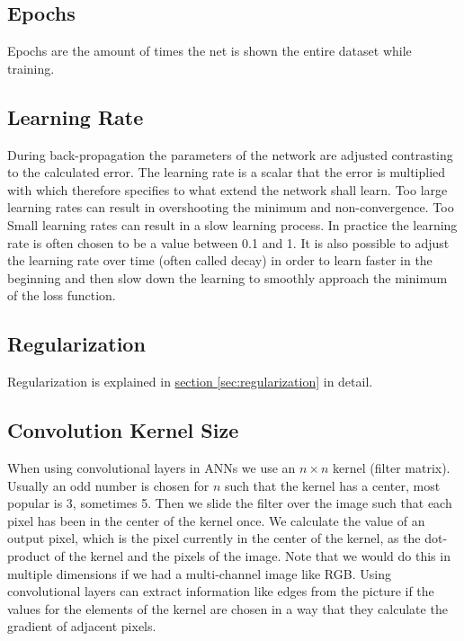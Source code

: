 \subsection{Epochs}

Epochs are the amount of times the net is shown the entire dataset while training.

\subsection{Learning Rate}
\label{sec:learning_rate}

During back-propagation the parameters of the network are adjusted contrasting to the calculated error. The learning rate is a scalar that the error is multiplied with which therefore specifies to what extend the network shall learn. Too large learning rates can result in overshooting the minimum and non-convergence. Too Small learning rates can result in a slow learning process. In practice the learning rate is often chosen to be a value between 0.1 and 1. It is also possible to adjust the learning rate over time (often called decay) in order to learn faster in the beginning and then slow down the learning to smoothly approach the minimum of the loss function.

\subsection{Regularization}

Regularization is explained in \hyperref[sec:regularization]{section \ref*{sec:regularization}} in detail.

\subsection{Convolution Kernel Size}

When using convolutional layers in ANNs we use an $n \times n$ kernel (filter matrix). Usually an odd number is chosen for $n$ such that the kernel has a center, most popular is 3, sometimes 5. Then we slide the filter over the image such that each pixel has been in the center of the kernel once. We calculate the value of an output pixel, which is the pixel currently in the center of the kernel, as the dot-product of the kernel and the pixels of the image. Note that we would do this in multiple dimensions if we had a multi-channel image like RGB. Using convolutional layers can extract information like edges from the picture if the values for the elements of the kernel are chosen in a way that they calculate the gradient of adjacent pixels.

